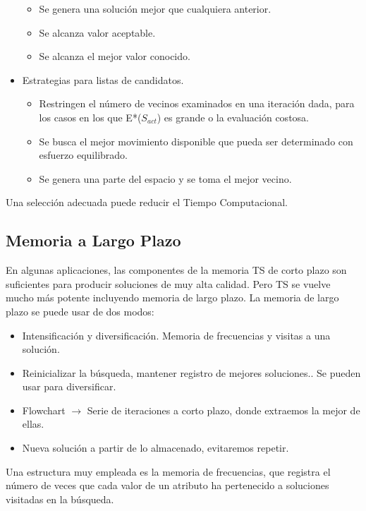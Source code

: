\documentclass{llncs}
\begin{document}
\begin{itemize}
\begin{itemize}
\item Se genera una soluci\'{o}n mejor que cualquiera anterior.
\item Se alcanza valor aceptable.
\item Se alcanza el mejor valor conocido.
\end{itemize}
\item Estrategias para listas de candidatos.
\begin{itemize}
\item Restringen el n\'{u}mero de vecinos examinados en una iteraci\'{o}n dada, para los casos en los que E*($S_{act}$) es grande o la evaluaci\'{o}n costosa.
\item Se busca el mejor movimiento disponible que pueda ser determinado con esfuerzo equilibrado.
\item Se genera una parte del espacio y se toma el mejor vecino.
\end{itemize}
\end{itemize}

Una selecci\'{o}n adecuada puede reducir el Tiempo Computacional.

\subsection*{Memoria a Largo Plazo}
En algunas aplicaciones, las componentes de la memoria TS de corto plazo son suficientes para producir soluciones de muy alta calidad. Pero TS se vuelve mucho m\'{a}s potente incluyendo memoria de largo plazo. La memoria de largo plazo se puede usar de dos modos:\\
\begin{itemize}
\item Intensificaci\'{o}n y diversificaci\'{o}n. Memoria de frecuencias y visitas a una soluci\'{o}n.
\item Reinicializar la b\'{u}squeda, mantener registro de mejores soluciones.. Se pueden usar para diversificar.
\item Flowchart $\rightarrow$ Serie de iteraciones a corto plazo, donde extraemos la mejor de ellas.
\item Nueva soluci\'{o}n a partir de lo almacenado, evitaremos repetir.
\end{itemize}

Una estructura muy empleada es la memoria de frecuencias, que registra el n\'{u}mero de veces que cada valor de un atributo ha pertenecido a soluciones visitadas en la b\'{u}squeda.
\end{document}
